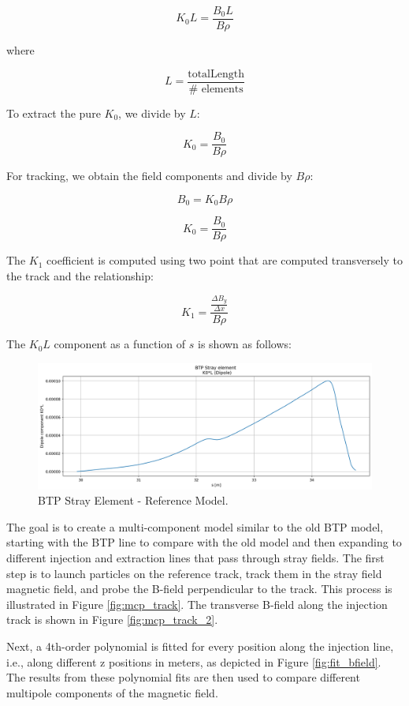 \[
K_{0}L = \frac{B_{0}L}{B\rho}
\]

where 

\[
L = \frac{\text{totalLength}}{\# \text{ elements}}
\]

To extract the pure \( K_{0} \), we divide by \( L \):

\[
K_{0} = \frac{B_{0}}{B\rho}
\]

For tracking, we obtain the field components and divide by \( B\rho \):

\[
B_{0} = K_{0}B\rho
\]

\[
K_{0} = \frac{B_{0}}{B\rho}
\]

The \( K_{1} \) coefficient is computed using two point that are computed transversely to the track and the relationship:

\[
K_{1} = \frac{\frac{\Delta B_{y}}{\Delta x}}{B\rho}
\]

The \( K_{0}L \) component as a function of \( s \) is shown as follows:

\begin{figure}[H]
\centering
\includegraphics[width=1.0\textwidth]{02_Simulation/images/BTP_old_model_stray.png}
\caption{BTP Stray Element - Reference Model.}
\label{fig:transfer_matrix_1}
\end{figure}


The goal is to create a multi-component model similar to the old BTP model, starting with the BTP line to compare with the old model and then expanding to different injection and extraction lines that pass through stray fields. The first step is to launch particles on the reference track, track them in the stray field magnetic field, and probe the B-field perpendicular to the track. This process is illustrated in Figure \ref{fig:mcp_track}. The transverse B-field along the injection track is shown in Figure \ref{fig:mcp_track_2}. 

Next, a 4th-order polynomial is fitted for every position along the injection line, i.e., along different z positions in meters, as depicted in Figure \ref{fig:fit_bfield}. The results from these polynomial fits are then used to compare different multipole components of the magnetic field.

